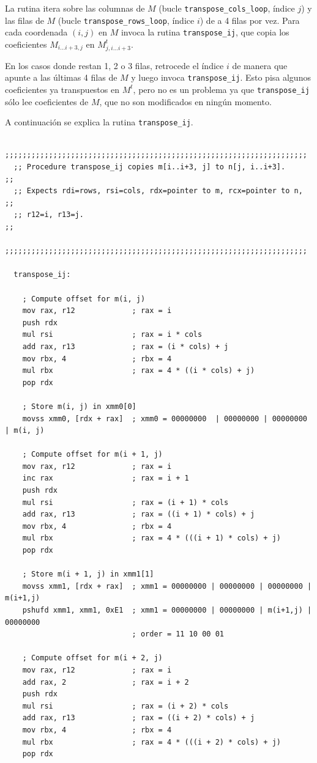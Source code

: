 \documentclass[a4paper, 10pt, twoside]{article}
\newcommand{\cc}[1]{\texttt{#1}}
\begin{document}
La rutina itera sobre las columnas de $M$ (bucle \cc{transpose\_cols\_loop},
índice $j$) y las filas de $M$ (bucle \cc{transpose\_rows\_loop}, índice $i$)
de a 4 filas por vez. Para cada coordenada $(i,j)$ en $M$ invoca la rutina
\cc{transpose\_ij}, que copia los coeficientes $M_{i \ldots i+3,j}$ en
$M^t_{j,i \ldots i+3}$.

En los casos donde restan 1, 2 o 3 filas, retrocede el índice $i$ de manera que
apunte a las últimas 4 filas de $M$ y luego invoca \cc{transpose\_ij}. Esto
pisa algunos coeficientes ya transpuestos en $M^t$, pero no es un problema ya
que \cc{transpose\_ij} sólo lee coeficientes de $M$, que no son modificados en
ningún momento.

A continuación se explica la rutina \cc{transpose\_ij}.

\begin{verbatim}
  ;;;;;;;;;;;;;;;;;;;;;;;;;;;;;;;;;;;;;;;;;;;;;;;;;;;;;;;;;;;;;;;;;;;;;
  ;; Procedure transpose_ij copies m[i..i+3, j] to n[j, i..i+3].     ;;
  ;; Expects rdi=rows, rsi=cols, rdx=pointer to m, rcx=pointer to n, ;;
  ;; r12=i, r13=j.                                                   ;;
  ;;;;;;;;;;;;;;;;;;;;;;;;;;;;;;;;;;;;;;;;;;;;;;;;;;;;;;;;;;;;;;;;;;;;;

  transpose_ij:

    ; Compute offset for m(i, j)
    mov rax, r12             ; rax = i
    push rdx
    mul rsi                  ; rax = i * cols
    add rax, r13             ; rax = (i * cols) + j
    mov rbx, 4               ; rbx = 4
    mul rbx                  ; rax = 4 * ((i * cols) + j)
    pop rdx

    ; Store m(i, j) in xmm0[0]
    movss xmm0, [rdx + rax]  ; xmm0 = 00000000  | 00000000 | 00000000 | m(i, j)

    ; Compute offset for m(i + 1, j)
    mov rax, r12             ; rax = i
    inc rax                  ; rax = i + 1
    push rdx
    mul rsi                  ; rax = (i + 1) * cols
    add rax, r13             ; rax = ((i + 1) * cols) + j
    mov rbx, 4               ; rbx = 4
    mul rbx                  ; rax = 4 * (((i + 1) * cols) + j)
    pop rdx

    ; Store m(i + 1, j) in xmm1[1]
    movss xmm1, [rdx + rax]  ; xmm1 = 00000000 | 00000000 | 00000000 | m(i+1,j)
    pshufd xmm1, xmm1, 0xE1  ; xmm1 = 00000000 | 00000000 | m(i+1,j) | 00000000
                             ; order = 11 10 00 01

    ; Compute offset for m(i + 2, j)
    mov rax, r12             ; rax = i
    add rax, 2               ; rax = i + 2
    push rdx
    mul rsi                  ; rax = (i + 2) * cols
    add rax, r13             ; rax = ((i + 2) * cols) + j
    mov rbx, 4               ; rbx = 4
    mul rbx                  ; rax = 4 * (((i + 2) * cols) + j)
    pop rdx


\end{verbatim}
\end{document}
